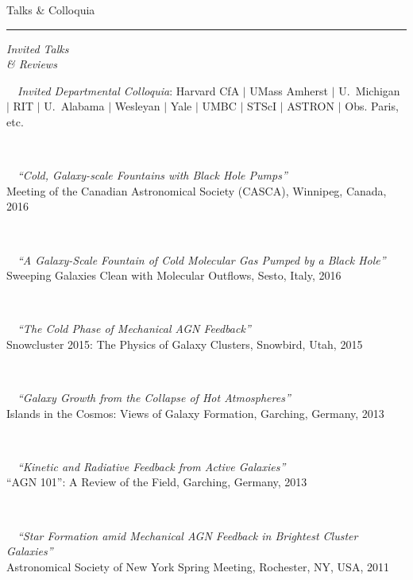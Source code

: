 \documentclass[11pt]{article}
\makeatletter
\def\vhrulefill#1{\leavevmode\leaders\hrule\@height#1\hfill \kern\z@}
\makeatother
\begin{document}
\vspace{4mm}




{\sc Talks \& Colloquia} \vhrulefill{0.4pt}

\vspace{4mm}

\hspace{2.5mm} \parbox{1.5in}{{\it Invited Talks \\ \& Reviews }} 
\parbox{5.15in}{
\textbullet~~{\it Invited Departmental Colloquia}: Harvard CfA $|$ UMass Amherst $|$ U.~Michigan $|$ RIT $|$ U.~Alabama $|$ Wesleyan $|$ Yale $|$ UMBC $|$ STScI $|$ ASTRON $|$ Obs. Paris, etc.}\\


\hspace{42mm} \parbox{5.15in}{
\textbullet~~{\it ``Cold, Galaxy-scale Fountains with Black Hole Pumps''}\\ Meeting of the Canadian Astronomical Society (CASCA), Winnipeg, Canada, 2016}\\


\hspace{42mm} \parbox{5.15in}{
\textbullet~~{\it ``A Galaxy-Scale Fountain of Cold Molecular Gas Pumped by a Black Hole''}\\ Sweeping Galaxies Clean with Molecular Outflows, Sesto, Italy, 2016}\\



\hspace{42mm} \parbox{5.15in}{
\textbullet~~{\it ``The Cold Phase of Mechanical AGN Feedback''}\\ Snowcluster 2015: The Physics of Galaxy Clusters, Snowbird, Utah, 2015}\\


\hspace{42mm} \parbox{5.15in}{
\textbullet~~{\it ``Galaxy Growth from the Collapse of Hot Atmospheres''}\\ Islands in the Cosmos: Views of Galaxy Formation, Garching, Germany, 2013}\\

\hspace{42mm} \parbox{5.15in}{
\textbullet~~{\it ``Kinetic and Radiative Feedback from Active Galaxies''} \\ ``AGN 101'': A Review of the Field, Garching, Germany, 2013}\\


\hspace{42mm} \parbox{5.15in}{
\textbullet~~{\it ``Star Formation amid Mechanical AGN Feedback in Brightest Cluster Galaxies''}\\ Astronomical Society of New York Spring Meeting, Rochester, NY, USA, 2011}\\
\end{document}
